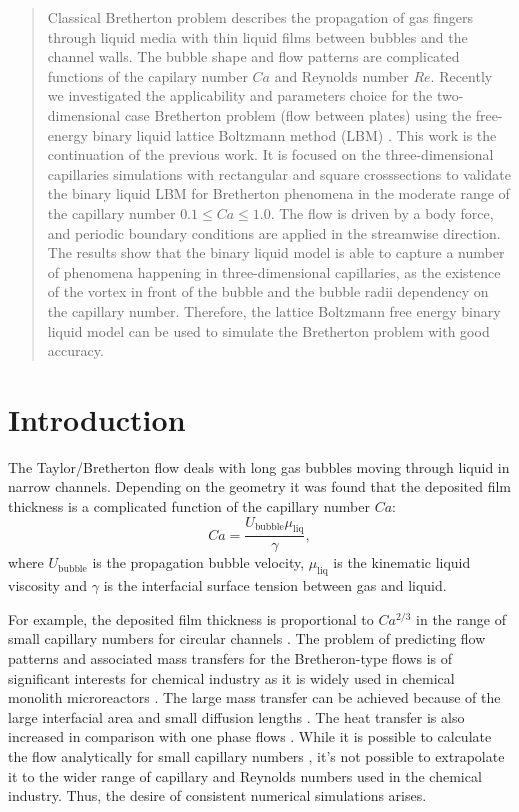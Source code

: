 \documentclass{article}
\begin{document}
\begin{abstract}
Classical Bretherton problem describes the propagation of gas fingers through liquid media with
thin liquid films between bubbles and the channel walls. The bubble shape and flow patterns are
complicated functions of the capilary number $Ca$ and Reynolds number $Re$. Recently we investigated
the applicability and parameters choice for the two-dimensional case Bretherton problem (flow
between plates) using the free-energy binary liquid lattice Boltzmann method (LBM)
\cite{kuzmin-binary2d}. This
work is the continuation of the previous work. It is focused on the three-dimensional capillaries
simulations with rectangular and square crosssections to
validate the binary liquid LBM for  Bretherton phenomena in the moderate range of the capillary
number $0.1\leq Ca \leq 1.0$.  
The flow is driven by a body force,
and
periodic boundary conditions are applied in the streamwise direction. The results show that the
binary liquid model is able to capture a number of phenomena happening in three-dimensional
capillaries, as the existence of the vortex in front of the bubble and the bubble radii dependency
on the capillary number. Therefore, the lattice Boltzmann free energy binary liquid model can be
used to simulate the Bretherton problem with good accuracy.
\end{abstract}

\section{Introduction}
The Taylor/Bretherton \cite{bretherton} flow deals with long gas bubbles moving through liquid in
narrow channels. Depending on the geometry it was found that the deposited film thickness
is a complicated function of the capillary number $Ca$:
\begin{equation}
\label{capillary:number:definition}
Ca=\frac{U_{\mathrm{bubble}} \mu_{\mathrm{liq}}}{\gamma},
\end{equation}
where $U_{\mathrm{bubble}}$ is the propagation bubble velocity, $\mu_{\mathrm{liq}}$ is the
kinematic liquid viscosity and $\gamma$ is the interfacial surface tension between gas and liquid. 

For example, the deposited film thickness
is proportional to $Ca^{2/3}$ in the range of small capillary numbers for circular channels
\cite{bretherton,heil-bretherton}. 
The problem of predicting flow patterns and associated mass transfers for the Bretheron-type flows
is of significant interests for chemical industry as it is widely used in chemical monolith
microreactors \cite{kreutzer-pressure-drop}. The large mass transfer can be achieved because of the
large interfacial area and small diffusion lengths \cite{cerro-bubble-train}. The heat transfer is
also increased in comparison with one phase flows \cite{fukugata-levelset}. While it
is possible to calculate the flow analytically for small capillary numbers \cite{bretherton}, it's
not possible to extrapolate it to the wider range of capillary and Reynolds numbers used in the
chemical
industry. Thus, the desire of consistent numerical simulations arises.
\end{document}
